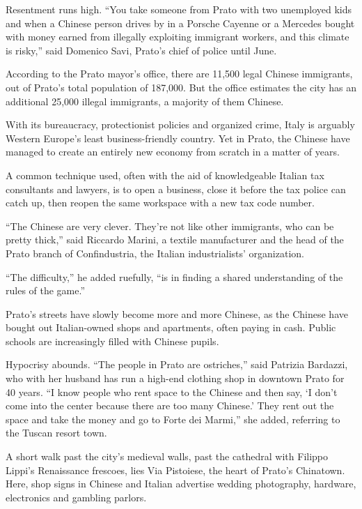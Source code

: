 ﻿\documentclass[12pt]{article}
\begin{document}
Resentment runs high. ``You take someone from Prato with two unemployed kids and when a Chinese
person drives by in a Porsche Cayenne or a Mercedes bought with money earned from illegally
exploiting immigrant workers, and this climate is risky,'' said Domenico Savi, Prato's chief of
police until June.

According to the Prato mayor's office, there are 11,500 legal Chinese immigrants, out of Prato's
total population of 187,000. But the office estimates the city has an additional 25,000 illegal
immigrants, a majority of them Chinese.

With its bureaucracy, protectionist policies and organized crime, Italy is arguably Western Europe's
least business-friendly country. Yet in Prato, the Chinese have managed to create an entirely new
economy from scratch in a matter of years.

A common technique used, often with the aid of knowledgeable Italian tax consultants and lawyers, is
to open a business, close it before the tax police can catch up, then reopen the same workspace with
a new tax code number.

``The Chinese are very clever. They're not like other immigrants, who can be pretty thick,'' said
Riccardo Marini, a textile manufacturer and the head of the Prato branch of Confindustria, the
Italian industrialists' organization.

``The difficulty,'' he added ruefully, ``is in finding a shared understanding of the rules of the
game.''

Prato's streets have slowly become more and more Chinese, as the Chinese have bought out
Italian-owned shops and apartments, often paying in cash. Public schools are increasingly filled
with Chinese pupils.

Hypocrisy abounds. ``The people in Prato are ostriches,'' said Patrizia Bardazzi, who with her
husband has run a high-end clothing shop in downtown Prato for 40 years. ``I know people who rent
space to the Chinese and then say, `I don't come into the center because there are too many
Chinese.' They rent out the space and take the money and go to Forte dei Marmi,'' she added,
referring to the Tuscan resort town.

A short walk past the city's medieval walls, past the cathedral with Filippo Lippi's Renaissance
frescoes, lies Via Pistoiese, the heart of Prato's Chinatown. Here, shop signs in Chinese and
Italian advertise wedding photography, hardware, electronics and gambling parlors.
\end{document}
